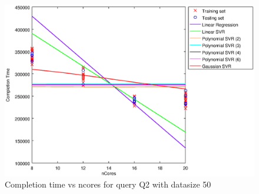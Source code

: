 
\begin {figure}[hbtp]
\centering
\includegraphics[width=\textwidth]{output/Q2_50_ALL_FEATURES/plot_Q2_50.eps}
\caption{Completion time vs ncores for query Q2 with datasize 50}
\label{fig:all_linear_Q2_50}
\end {figure}
